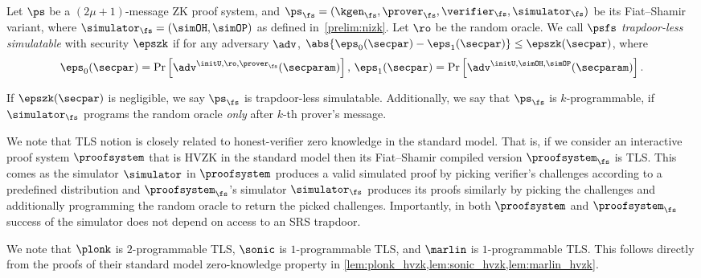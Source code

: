 \begin{definition}
  \label{def:tls}
  Let $\ps$ be a $(2\mu + 1)$-message ZK proof system, and
  $\ps_\fs= (\kgen_{\fs}, \prover_{\fs}, \verifier_{\fs}, \simulator_{\fs})$ be its
  Fiat--Shamir variant, where $\simulator_{\fs} = (\simOH, \simOP)$ as defined in~\cref{prelim:nizk}. Let $\ro$ be the random oracle. 
  We call $\psfs$ \emph{trapdoor-less simulatable} with security $\epszk$ if for any
  adversary $\adv$, $\abs{\eps_0(\secpar) - \eps_1(\secpar)} \leq \epszk(\secpar)$, where
  \begin{align*}
    \eps_0 (\secpar) = \Pr\left[ \adv^{\initU, \ro, \prover_{\fs}} (\secparam) \right],\,
    \eps_1 (\secpar)=  \Pr \left[\adv^{\initU, \simOH, \simOP} (\secparam) \right].
  \end{align*}
  
  If $\epszk(\secpar)$ is negligible, we say $\ps_{\fs}$ is trapdoor-less simulatable. Additionally, we say that $\ps_{\fs}$ is $k$-programmable, if $\simulator_\fs$
  programs the random oracle \emph{only} after $k$-th prover's message.
  \end{definition}

  
\begin{remark}
  We note that TLS notion is closely related to honest-verifier zero knowledge in the
  standard model. That is, if we consider an interactive proof system $\proofsystem$
  that is HVZK in the standard model then its Fiat--Shamir compiled version
  $\proofsystem_\fs$ is TLS. This comes as the simulator $\simulator$ in
  $\proofsystem$ produces a valid simulated proof by picking verifier's challenges
  according to a predefined distribution and $\proofsystem_\fs$'s simulator
  $\simulator_\fs$ produces its proofs similarly by picking the challenges and
  additionally programming the random oracle to return the picked
  challenges. Importantly, in both $\proofsystem$ and $\proofsystem_\fs$ success of
  the simulator does not depend on access to an SRS trapdoor.
\end{remark}

We note that $\plonk$ is $2$-programmable TLS, $\sonic$ is $1$-programmable TLS,
and $\marlin$ is $1$-programmable TLS. This follows directly from the proofs of
their standard model zero-knowledge property in
\cref{lem:plonk_hvzk,lem:sonic_hvzk,lem:marlin_hvzk}. 

